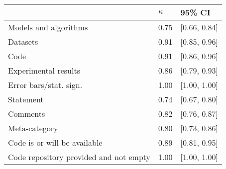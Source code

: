 \begin{tabular}{lll}
\hline
& $\kappa$ & 95\% CI\\
\hline
Models and algorithms & 0.75 & [0.66, 0.84]  \\
Datasets & 0.91 & [0.85, 0.96]  \\
Code & 0.91 & [0.86, 0.96]  \\
Experimental results & 0.86 & [0.79, 0.93]  \\
Error bars/stat. sign.& 1.00 & [1.00, 1.00]  \\
Statement & 0.74 & [0.67, 0.80]  \\
Comments & 0.82  & [0.76, 0.87]  \\
Meta-category & 0.80  & [0.73, 0.86]  \\
Code is or will be available & 0.89 & [0.81, 0.95]  \\
Code repository provided and not empty & 1.00 & [1.00, 1.00]  \\
\hline
\end{tabular}
